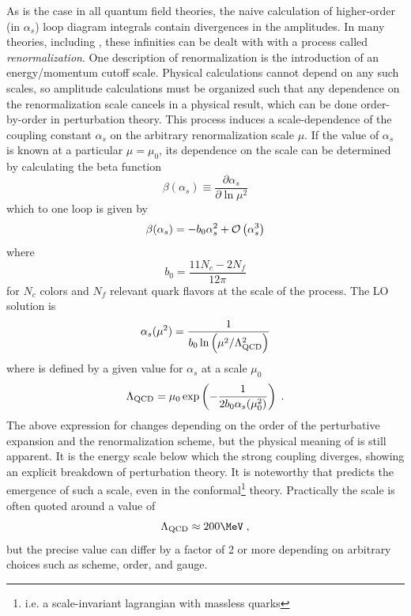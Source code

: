 
As is the case in all quantum field theories, the naive calculation of higher-order (in $\alpha_s$) loop diagram integrals contain divergences in the amplitudes.
In many theories, including \qcd \cite{Gross:1973ju}, these infinities can be dealt with with a process called \emph{renormalization}.
One description of renormalization is the introduction of an energy/momentum cutoff scale.
Physical calculations cannot depend on any such scales, so amplitude calculations must be organized such that any dependence on the renormalization scale cancels in a physical result, which can be done order-by-order in perturbation theory.
This process induces a scale-dependence of the coupling constant $\alpha_s$ on the arbitrary renormalization scale $\mu$.
If the value of $\alpha_s$ is known at a particular $\mu = \mu_0$, its dependence on the scale can be determined by calculating the beta function
\begin{equation}
  \beta(\alpha_s) \equiv  \frac{\partial \alpha_s}{\partial \ln \mu^2}
\end{equation}
which to one loop is given by \cite{Gross:1973id}
\begin{equation}
  \beta(\alpha_s) = -b_0 \alpha_s^2 + \mathcal{O}\left( \alpha_s^3 \right)
\end{equation}
where
\[
b_0 = \frac{11 N_c - 2 N_f}{12\pi}
\]
for $N_c$ colors and $N_f$ relevant quark flavors at the scale of the process.
The \ac{LO} solution is
\begin{equation}
  \alpha_s(\mu^2) = \frac{1}{b_0 \ln\left(\mu^2 / \Lambda_\textrm{QCD}^2\right)}
  \label{eq:running_as}
\end{equation}
where \lqcd is defined by a given value for $\alpha_s$ at a scale $\mu_0$
\[
\Lambda_\textrm{QCD} = \mu_0 \exp \left( -\frac{1}{2 b_0 \alpha_s(\mu_0^2)} \right) \; .
\]
The above expression for \lqcd changes depending on the order of the perturbative expansion and the renormalization scheme, but the physical meaning of \lqcd is still apparent.
It is the energy scale below which the strong coupling diverges, showing an explicit breakdown of perturbation theory.
It is noteworthy that \qcd predicts the emergence of such a scale, even in the conformal\footnote{i.e. a scale-invariant lagrangian with massless quarks} theory.
Practically the \qcd scale is often quoted around a value of %
\[
\lqcd \approx 200 \MeV \;,
\]
but the precise value can differ by a factor of 2 or more depending on arbitrary choices such as scheme, order, and gauge.

